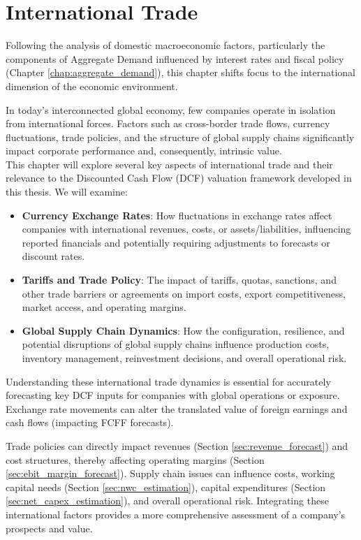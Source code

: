 \chapter{International Trade} \label{chap:international_trade}

Following the analysis of domestic macroeconomic factors, particularly the components of Aggregate Demand influenced by interest rates and fiscal policy (Chapter \ref{chap:aggregate_demand}), this chapter shifts focus to the international dimension of the economic environment.

In today's interconnected global economy, few companies operate in isolation from international forces. Factors such as cross-border trade flows, currency fluctuations, trade policies, and the structure of global supply chains significantly impact corporate performance and, consequently, intrinsic value.\\

This chapter will explore several key aspects of international trade and their relevance to the Discounted Cash Flow (DCF) valuation framework developed in this thesis. We will examine:
\begin{itemize}
    \item \textbf{Currency Exchange Rates}: How fluctuations in exchange rates affect companies with international revenues, costs, or assets/liabilities, influencing reported financials and potentially requiring adjustments to forecasts or discount rates.
    \item \textbf{Tariffs and Trade Policy}: The impact of tariffs, quotas, sanctions, and other trade barriers or agreements on import costs, export competitiveness, market access, and operating margins.
    \item \textbf{Global Supply Chain Dynamics}: How the configuration, resilience, and potential disruptions of global supply chains influence production costs, inventory management, reinvestment decisions, and overall operational risk.
\end{itemize}

Understanding these international trade dynamics is essential for accurately forecasting key DCF inputs for companies with global operations or exposure. Exchange rate movements can alter the translated value of foreign earnings and cash flows (impacting FCFF forecasts).

Trade policies can directly impact revenues (Section \ref{sec:revenue_forecast}) and cost structures, thereby affecting operating margins (Section \ref{sec:ebit_margin_forecast}). Supply chain issues can influence costs, working capital needs (Section \ref{sec:nwc_estimation}), capital expenditures (Section \ref{sec:net_capex_estimation}), and overall operational risk. Integrating these international factors provides a more comprehensive assessment of a company's prospects and value.

